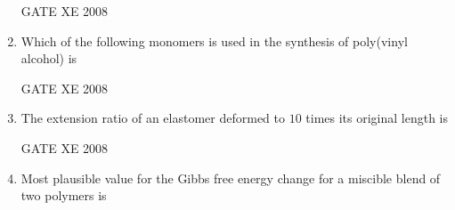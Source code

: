 \documentclass[12pt]{article}
\begin{document}
\begin{enumerate}
\begin{enumerate}
\end{enumerate}

GATE XE 2008

\item Which of the following monomers is used in the synthesis of poly(vinyl alcohol) is  

\begin{enumerate}
\end{enumerate}

GATE XE 2008

\item The extension ratio of an elastomer deformed to $10$ times its original length is  

\begin{enumerate}
\end{enumerate}

GATE XE 2008

\item Most plausible value for the Gibbs free energy change for a miscible blend of two polymers is  

\begin{enumerate}
\end{enumerate}


\end{enumerate}
\end{document}
